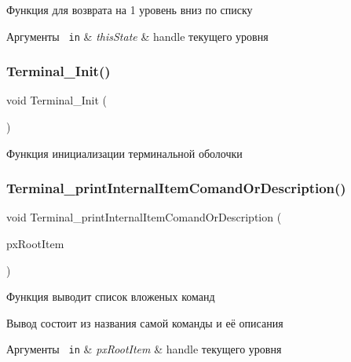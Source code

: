Функция для возврата на 1 уровень вниз по списку 


\begin{DoxyParams}[1]{Аргументы}
\mbox{\texttt{ in}}  & {\em this\+State} & handle текущего уровня \\
\hline
\end{DoxyParams}
\mbox{\label{group__terminal_gacc9b80fa13f248f795d961b1817b7d4b}} 
\subsubsection{\texorpdfstring{Terminal\_Init()}{Terminal\_Init()}}
{\footnotesize\ttfamily void Terminal\+\_\+\+Init (\begin{DoxyParamCaption}\item[{void}]{ }\end{DoxyParamCaption})}



Функция инициализации терминальной оболочки 

\mbox{\label{group__terminal_gab3311fb037407fc4553f30a8122f2dc3}} 
\subsubsection{\texorpdfstring{Terminal\_printInternalItemComandOrDescription()}{Terminal\_printInternalItemComandOrDescription()}}
{\footnotesize\ttfamily void Terminal\+\_\+print\+Internal\+Item\+Comand\+Or\+Description (\begin{DoxyParamCaption}\item[{\mbox{\hyperlink{group__terminal_gadcd4acb437149111c071e40bccbac72a}{Terminal\+\_\+state\+Handle}}}]{px\+Root\+Item }\end{DoxyParamCaption})}



Функция выводит список вложеных команд 

Вывод состоит из названия самой команды и её описания


\begin{DoxyParams}[1]{Аргументы}
\mbox{\texttt{ in}}  & {\em px\+Root\+Item} & handle текущего уровня \\
\hline
\end{DoxyParams}
\mbox{\label{group__terminal_ga7a0e27324a74d61713c05ec981b8d5ed}} 
